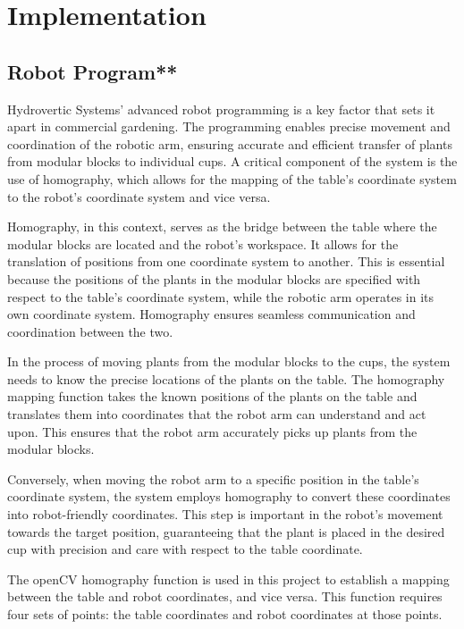 \documentclass[Setup/main.tex]{subfiles}
\begin{document}
\section{Implementation}

\subsection{Robot Program**}

Hydrovertic Systems' advanced robot programming is a key factor that sets it apart in commercial gardening. The programming enables precise movement and coordination of the robotic arm, ensuring accurate and efficient transfer of plants from modular blocks to individual cups. A critical component of the system is the use of homography, which allows for the mapping of the table's coordinate system to the robot's coordinate system and vice versa.

Homography, in this context, serves as the bridge between the table where the modular blocks are located and the robot's workspace. It allows for the translation of positions from one coordinate system to another. This is essential because the positions of the plants in the modular blocks are specified with respect to the table's coordinate system, while the robotic arm operates in its own coordinate system. Homography ensures seamless communication and coordination between the two.

In the process of moving plants from the modular blocks to the cups, the system needs to know the precise locations of the plants on the table. The homography mapping function takes the known positions of the plants on the table and translates them into coordinates that the robot arm can understand and act upon. This ensures that the robot arm accurately picks up plants from the modular blocks.

Conversely, when moving the robot arm to a specific position in the table's coordinate system, the system employs homography to convert these coordinates into robot-friendly coordinates. This step is important in the robot's movement towards the target position, guaranteeing that the plant is placed in the desired cup with precision and care with respect to the table coordinate. 

The openCV homography function is used in this project to establish a mapping between the table and robot coordinates, and vice versa. This function requires four sets of points: the table coordinates and robot coordinates at those points.
\end{document}

